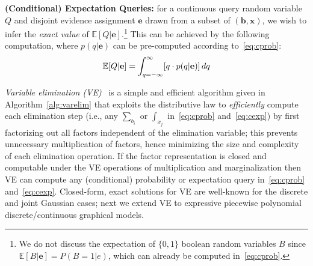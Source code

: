 \documentclass[letterpaper]{article}
\newcommand{\E}{\mathbb{E}}
\renewcommand{\vec}[1]{\mathbf{#1}}
\begin{document}
{%
{\bf (Conditional) Expectation Queries:} for a continuous
query random variable
$Q$ and disjoint evidence assignment $\vec{e}$ drawn from 
a subset of $(\vec{b},\vec{x})$, we wish to infer 
the \emph{exact value} of $\E[Q|\vec{e}]$.\footnote{We do not 
discuss the expectation of $\{0,1\}$ boolean
random variables $B$ since $\E[B|\vec{e}] = P(B=1|e)$, which can 
already be computed in~\eqref{eq:cprob}.} 
This can be achieved by the following
computation, where $p(q|\vec{e})$ can be pre-computed according to~\eqref{eq:cprob}:
\vspace{-0.5mm}
{\footnotesize 
\begin{equation} 
\E[Q|\vec{e}] = 
\int_{q=-\infty}^{\infty} [q \cdot p(q|\vec{e})] \, dq \label{eq:cexp}
\vspace{-0.5mm}
\end{equation}
}

\emph{Variable elimination (VE)}~\cite{varelim} is a simple and
efficient algorithm given in Algorithm~\ref{alg:varelim} that exploits
the distributive law to \emph{efficiently} compute each elimination
step (i.e., any $\sum_{b_{i}}$ or $\int_{x_{j}}$ in~\eqref{eq:cprob}
and~\eqref{eq:cexp}) by first factorizing out all factors independent
of the elimination variable; this prevents unnecessary multiplication
of factors, hence minimizing the size and complexity of each
elimination operation.  If the factor representation is closed and
computable under the VE operations of multiplication and
marginalization then VE can compute any (conditional) probability or
expectation query in~\eqref{eq:cprob} and~\eqref{eq:cexp}.  
Closed-form, exact solutions for VE are well-known for the discrete
and joint Gaussian cases; next we extend VE to expressive
piecewise polynomial discrete/continuous graphical models.


\incmargin{1.5em}
\linesnumbered
\begin{algorithm}[hb!]
\dontprintsemicolon


\end{algorithm}}
\end{document}
